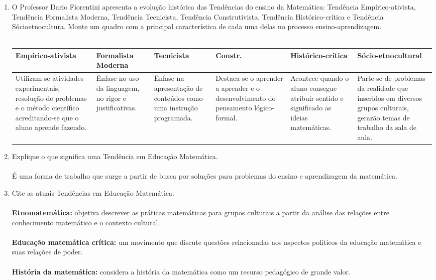 \documentclass[a4paper, 12pt]{article}
\begin{document}
\begin{enumerate}
\item O Professor Dario Fiorentini apresenta a evolução histórica das Tendências do ensino da Matemática: Tendência Empírico-ativista, Tendência Formalista Moderna, Tendência Tecnicista, Tendência Construtivista, Tendência Histórico-crítica e Tendência Sócioetnocultura. Monte um quadro com a principal característica de cada uma delas no processo ensino-aprendizagem. \\ \\
  \begin{tabular}{ | m{2cm} | m{2cm} | m{2cm} | m{2cm} | m{2cm} | m{2cm} |}
    \textbf{Empírico-ativista} & \textbf{Formalista Moderna} & \textbf{Tecnicista} & \textbf{Constr.} & \textbf{Histórico-crítica} & \textbf{Sócio-etnocultural} \\ \hline
    Utilizam-se atividades experimentais, resolução de problemas e o método científico acreditando-se que o aluno aprende fazendo. &
    Ênfase no uso da linguagem, no rigor e justificativas. &
    Ênfase na apresentação de conteúdos como uma instrução programada. &
    Destaca-se o aprender a aprender e o desenvolvimento do pensamento lógico-formal. &
    Acontece quando o aluno consegue atribuir sentido e significado as ideias matemáticas. &
    Parte-se de problemas da realidade que inseridos em diversos grupos culturais, gerarão temas de trabalho da sala de aula.
  \end{tabular}
\item Explique o que significa uma Tendência em Educação Matemática. \\ \\
  É uma forma de trabalho que surge a partir de busca por soluções para problemas do ensino e aprendizagem da matemática.
\item Cite as atuais Tendências em Educação Matemática. \\ \\
  \textbf{Etnomatemática:} objetiva descrever as práticas matemáticas para grupos culturais a partir da análise das relações entre conhecimento matemático e o contexto cultural. \\ \\  
  \textbf{Educação matemática crítica:} um movimento que discute questões relacionadas aos aspectos políticos da educação matemática e suas relações de poder. \\ \\
  \textbf{História da matemática:} considera a história da matemática como um recurso pedagógico de grande valor. \\ \\

\end{enumerate}
\end{document}
